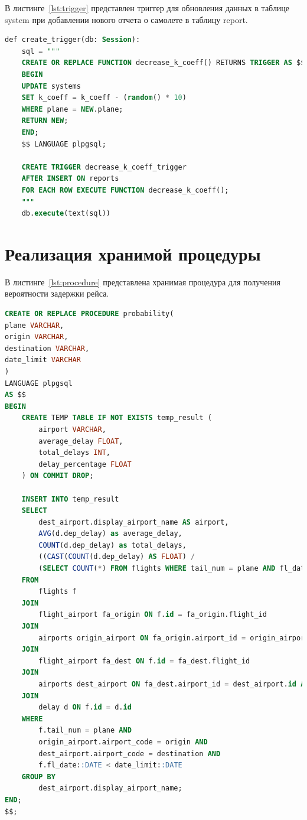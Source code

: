 В листинге~\ref{lst:trigger} представлен триггер для обновления данных в таблице system при добавлении нового отчета о самолете в таблицу report.

\begin{lstlisting}[label=lst:trigger, caption=Триггер для обновления данных в таблице system, language=SQL]
def create_trigger(db: Session):
    sql = """
    CREATE OR REPLACE FUNCTION decrease_k_coeff() RETURNS TRIGGER AS $$
    BEGIN
    UPDATE systems
    SET k_coeff = k_coeff - (random() * 10)
    WHERE plane = NEW.plane;
    RETURN NEW;
    END;
    $$ LANGUAGE plpgsql;

    CREATE TRIGGER decrease_k_coeff_trigger
    AFTER INSERT ON reports
    FOR EACH ROW EXECUTE FUNCTION decrease_k_coeff();
    """
    db.execute(text(sql))
\end{lstlisting}

\section{Реализация хранимой процедуры}
В листинге~\ref{lst:procedure} представлена хранимая процедура для получения вероятности задержки рейса.

\begin{lstlisting}[label=lst:procedure, caption=Хранимая процедура для получения вероятности задержки рейса, language=SQL]
CREATE OR REPLACE PROCEDURE probability(
plane VARCHAR,
origin VARCHAR,
destination VARCHAR,
date_limit VARCHAR
)
LANGUAGE plpgsql
AS $$
BEGIN
    CREATE TEMP TABLE IF NOT EXISTS temp_result (
        airport VARCHAR,
        average_delay FLOAT,
        total_delays INT,
        delay_percentage FLOAT
    ) ON COMMIT DROP;

    INSERT INTO temp_result
    SELECT
        dest_airport.display_airport_name AS airport,
        AVG(d.dep_delay) as average_delay,
        COUNT(d.dep_delay) as total_delays,
        ((CAST(COUNT(d.dep_delay) AS FLOAT) /
        (SELECT COUNT(*) FROM flights WHERE tail_num = plane AND fl_date::DATE < date_limit::DATE)) * 100.0) as delay_percentage
    FROM
        flights f
    JOIN
        flight_airport fa_origin ON f.id = fa_origin.flight_id
    JOIN
        airports origin_airport ON fa_origin.airport_id = origin_airport.id AND fa_origin.airport_type = 'departure'
    JOIN
        flight_airport fa_dest ON f.id = fa_dest.flight_id
    JOIN
        airports dest_airport ON fa_dest.airport_id = dest_airport.id AND fa_dest.airport_type = 'arrival'
    JOIN
        delay d ON f.id = d.id
    WHERE
        f.tail_num = plane AND
        origin_airport.airport_code = origin AND
        dest_airport.airport_code = destination AND
        f.fl_date::DATE < date_limit::DATE
    GROUP BY
        dest_airport.display_airport_name;
END;
$$;
\end{lstlisting}

